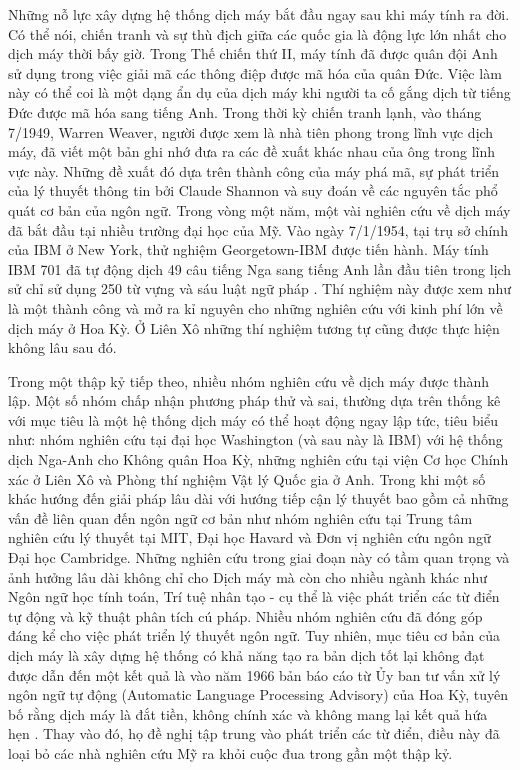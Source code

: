 Những nỗ lực xây dựng hệ thống dịch máy bắt đầu ngay sau khi máy tính ra đời. Có thể nói, chiến tranh và sự thù địch giữa các quốc gia là động lực lớn nhất cho dịch máy thời bấy giờ. Trong Thế chiến thứ II, máy tính đã được quân đội Anh sử dụng trong việc giải mã các thông điệp được mã hóa của quân Đức. Việc làm này có thể coi là một dạng ẩn dụ của dịch máy khi người ta cố gắng dịch từ tiếng Đức được mã hóa sang tiếng Anh. Trong thời kỳ chiến tranh lạnh, vào tháng 7/1949, Warren Weaver, người được xem là nhà tiên phong trong lĩnh vực dịch máy, đã viết một bản ghi nhớ đưa ra các đề xuất khác nhau của ông trong lĩnh vực này. Những đề xuất đó dựa trên thành công của máy phá mã, sự phát triển của lý thuyết thông tin bởi Claude Shannon và suy đoán về các nguyên tắc phổ quát cơ bản của ngôn ngữ. Trong vòng một năm, một vài nghiên cứu về dịch máy đã bắt đầu tại nhiều trường đại học của Mỹ. Vào ngày 7/1/1954, tại trụ sở chính của IBM ở New York, thử nghiệm Georgetown-IBM được tiến hành. Máy tính IBM 701 đã tự động dịch 49 câu tiếng Nga sang tiếng Anh lần đầu tiên trong lịch sử chỉ sử dụng 250 từ vựng và sáu luật ngữ pháp \cite{hutchins}. Thí nghiệm này được xem như là một thành công và mở ra kỉ nguyên cho những nghiên cứu với kinh phí lớn về dịch máy ở Hoa Kỳ. Ở Liên Xô những thí nghiệm tương tự cũng được thực hiện không lâu sau đó.

Trong một thập kỷ tiếp theo, nhiều nhóm nghiên cứu về dịch máy được thành lập. Một số nhóm chấp nhận phương pháp thử và sai, thường dựa trên thống kê với mục tiêu là một hệ thống dịch máy có thể hoạt động ngay lập tức, tiêu biểu như: nhóm nghiên cứu tại đại học Washington (và sau này là IBM) với hệ thống dịch Nga-Anh cho Không quân Hoa Kỳ, những nghiên cứu tại viện Cơ học Chính xác ở Liên Xô và Phòng thí nghiệm Vật lý Quốc gia ở Anh. Trong khi một số khác hướng đến giải pháp lâu dài với hướng tiếp cận lý thuyết bao gồm cả những vấn đề liên quan đến ngôn ngữ cơ bản như nhóm nghiên cứu tại Trung tâm nghiên cứu lý thuyết tại MIT, Đại học Havard và Đơn vị nghiên cứu ngôn ngữ Đại học Cambridge. Những nghiên cứu trong giai đoạn này có tầm quan trọng và ảnh hưởng lâu dài không chỉ cho Dịch máy mà còn cho nhiều ngành khác như Ngôn ngữ học tính toán, Trí tuệ nhân tạo - cụ thể là việc phát triển các từ điển tự động và kỹ thuật phân tích cú pháp. Nhiều nhóm nghiên cứu đã đóng góp đáng kể cho việc phát triển lý thuyết ngôn ngữ. Tuy nhiên, mục tiêu cơ bản của dịch máy là xây dựng hệ thống có khả năng tạo ra bản dịch tốt lại không đạt được dẫn đến một kết quả là vào năm 1966 bản báo cáo từ Ủy ban tư vấn xử lý ngôn ngữ tự động (Automatic Language Processing Advisory) của Hoa Kỳ, tuyên bố rằng dịch máy là đắt tiền, không chính xác và không mang lại kết quả hứa hẹn \cite{hutchins}. Thay vào đó, họ đề nghị tập trung vào phát triển các từ điển, điều này đã loại bỏ các nhà nghiên cứu Mỹ ra khỏi cuộc đua trong gần một thập kỷ.

